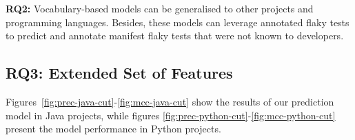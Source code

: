 \begin{tcolorbox}[
    left=2pt,right=2pt,top=2pt,bottom=2pt,
    arc=0pt,
    boxrule=1.2pt
]
\textbf{RQ2:} Vocabulary-based models can be generalised to other projects and programming languages. 
Besides, these models can leverage annotated flaky tests to predict and annotate manifest flaky tests that were not known to developers.
\end{tcolorbox}

\subsection{RQ3: Extended Set of Features}

Figures~\ref{fig:prec-java-cut}-\ref{fig:mcc-java-cut} show the results of our prediction model in Java projects, while figures \ref{fig:prec-python-cut}-\ref{fig:mcc-python-cut} present the model performance in Python projects. 

